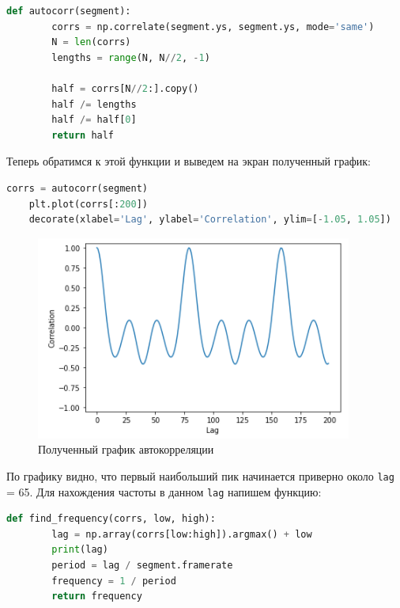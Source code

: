 \documentclass[a4paper]{article}
\begin{document}
\begin{lstlisting}[language=Python, caption= Функция для автокорреляции]
    def autocorr(segment):
        corrs = np.correlate(segment.ys, segment.ys, mode='same')
        N = len(corrs)
        lengths = range(N, N//2, -1)
    
        half = corrs[N//2:].copy()
        half /= lengths
        half /= half[0]
        return half
\end{lstlisting}
            
            Теперь обратимся к этой функции и выведем на экран полученный график:
            
\begin{lstlisting}[language=Python, caption= Получение графика автокорреляции]
    corrs = autocorr(segment)
    plt.plot(corrs[:200])
    decorate(xlabel='Lag', ylabel='Correlation', ylim=[-1.05, 1.05])
\end{lstlisting}               
            
            \begin{figure}[H]
                \centering
                \includegraphics{ex_4_spectr_autocorr.png}
                \caption{Полученный график автокорреляции}
                \label{fig:ex_4_spectr_autocorr}
            \end{figure}
            
            По графику видно, что первый наибольший пик начинается приверно около \texttt{lag} = 65. Для нахождения частоты в данном \texttt{lag} напишем функцию:
            
\begin{lstlisting}[language=Python, caption= Функция для нахождения частоты]
    def find_frequency(corrs, low, high):
        lag = np.array(corrs[low:high]).argmax() + low
        print(lag)
        period = lag / segment.framerate
        frequency = 1 / period
        return frequency
\end{lstlisting}   
            
\end{document}
